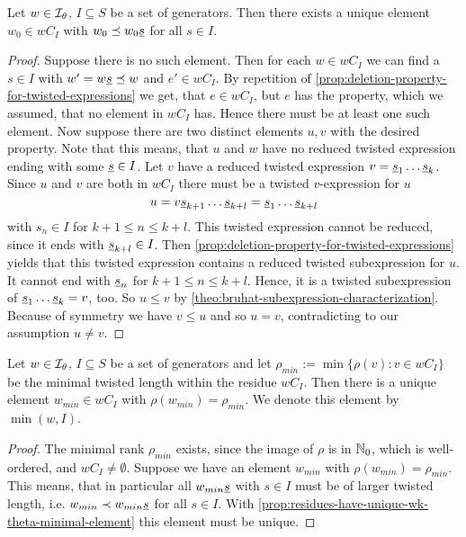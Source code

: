 \begin{prop}
	Let $w \in \mathcal{I}_{\theta}$, $I \subseteq S$ be a set of generators. Then there exists a unique element $w_0 \in wC_I$ with $w_0 \preceq w_0 \underline{s}$ for all $s \in I$.

	\begin{proof}
		Suppose there is no such element. Then for each $w \in wC_I$ we can find a $s \in I$ with $w' = w \underline{s} \preceq w$ and $e' \in wC_I$. By repetition of \ref{prop:deletion-property-for-twisted-expressions} we get, that $e \in wC_I$, but $e$ has the property, which we assumed, that no element in $wC_I$ has. Hence there must be at least one such element. Now suppose there are two distinct elements $u,v$ with the desired property. Note that this means, that $u$ and $w$ have no reduced twisted expression ending with some $\underline{s} \in I$. Let $v$ have a reduced twisted expression $v = \underline{s}_1 \ldots \underline{s}_k$. Since $u$ and $v$ are both in $wC_I$ there must be a twisted $v$-expression for $u$
		$$ u = v \underline{s}_{k+1} \ldots \underline{s}_{k+l} = \underline{s}_1 \ldots \underline{s}_{k+l} $$
		with $s_n \in I$ for $k+1 \leq n \leq k+l$. This twisted expression cannot be reduced, since it ends with $\underline{s}_{k+l} \in I$. Then \ref{prop:deletion-property-for-twisted-expressions} yields that this twisted expression contains a reduced twisted subexpression for $u$. It cannot end with $\underline{s}_n$ for $k+1 \leq n \leq k+l$. Hence, it is a twisted subexpression of $\underline{s}_1 \ldots \underline{s}_k = v$, too. So $u \leq v$ by \ref{theo:bruhat-subexpression-characterization}. Because of symmetry we have $v \leq u$ and so $u = v$, contradicting to our assumption $u \neq v$.
	\end{proof}
\end{prop}

\begin{coro}
	Let $w \in \mathcal{I}_{\theta}$, $I \subseteq S$ be a set of generators and let $\rho_{min} := \min \{ \rho(v) : v \in wC_I \}$ be the minimal twisted length within the residue $wC_I$. Then there is a unique element $w_{min} \in wC_I$ with $\rho(w_{min}) = \rho_{min}$. We denote this element by $\min(w,I)$.

	\begin{proof}
		The minimal rank $\rho_{min}$ exists, since the image of $\rho$ is in $\mathbb{N}_0$, which is well-ordered, and $wC_I \neq \emptyset$. Suppose we have an element $w_{min}$ with $\rho(w_{min}) = \rho_{min}$. This means, that in particular all $w_{min} \underline{s}$ with $s \in I$ must be of larger twisted length, i.e. $w_{min} \prec w_{min} \underline{s}$ for all $s \in I$. With \ref{prop:residues-have-unique-wk-theta-minimal-element} this element must be unique.
	\end{proof}
\end{coro}

